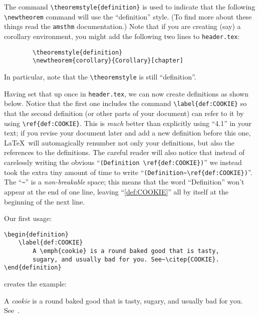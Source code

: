 The command \verb|\theoremstyle{definition}| is used to indicate that
the following \verb|\newtheorem| command will use the ``definition'' style.
(To find more about these things read the \verb|amsthm|
documentation.)  Note that if you are creating (say) a corollary
environment, you might add the following two lines to \verb|header.tex|:
\begin{verbatim}
        \theoremstyle{definition}
        \newtheorem{corollary}{Corollary}[chapter]
\end{verbatim}
In particular, note that the \verb|\theoremstyle| is still ``definition''.


Having set that up once in \verb|header.tex|, we can now create
definitions as shown below.
Notice that the first one includes
the command \verb|\label{def:COOKIE}| so that the second definition
(or other parts of your document) can refer to it by using
\verb|\ref{def:COOKIE}|.  This is \emph{much} better than explicitly
using ``4.1'' in your text; if you revise your document later and add
a new definition before this one, \LaTeX\ will automagically renumber
not only your definitions, but also the references to the definitions.
The careful reader will also notice that instead of carelessly writing
the obvious ``\verb|(Definition \ref{def:COOKIE})|'' we instead took
the extra tiny amount of time to write
``\verb|(Definition~\ref{def:COOKIE})|''.  The ``\verb|~|'' is a
\emph{non-breakable} space; this means that the word ``Definition''
won't appear at the end of one line, leaving ``\ref{def:COOKIE}'' all
by itself at the beginning of the next line.

Our first usage:
\begin{verbatim}
\begin{definition}
    \label{def:COOKIE}
        A \emph{cookie} is a round baked good that is tasty,
        sugary, and usually bad for you. See~\citep{COOKIE}.
\end{definition}
\end{verbatim}

\noindent creates the example:

\begin{definition}
    \label{def:COOKIE}
	A \emph{cookie} is a round baked good that is tasty,
	sugary, and usually bad for you. See~\citep{COOKIE}.
\end{definition}

